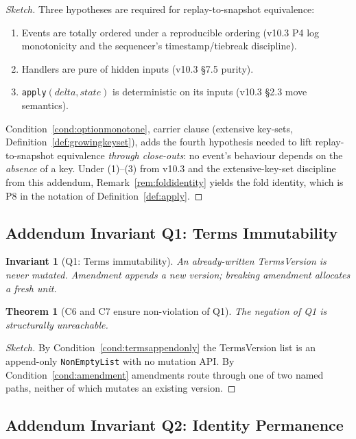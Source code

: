 \documentclass[11pt,a4paper]{article}
\newtheorem{theorem}[definition]{Theorem}
\newtheorem{invariant}[definition]{Invariant}
\begin{document}
\begin{proof}[Sketch]
Three hypotheses are required for replay-to-snapshot equivalence:
\begin{enumerate}[leftmargin=*,nosep]
\item Events are totally ordered under a reproducible ordering (v10.3 P4 log monotonicity and the sequencer's timestamp/tiebreak discipline).
\item Handlers are pure of hidden inputs (v10.3 \S 7.5 purity).
\item \texttt{apply}$(\mathit{delta}, \mathit{state})$ is deterministic on its inputs (v10.3 \S 2.3 move semantics).
\end{enumerate}
Condition~\ref{cond:optionmonotone}, carrier clause (extensive key-sets, Definition~\ref{def:growingkeyset}), adds the fourth hypothesis needed to lift replay-to-snapshot equivalence \emph{through close-outs}: no event's behaviour depends on the \emph{absence} of a key. Under (1)--(3) from v10.3 and the extensive-key-set discipline from this addendum, Remark~\ref{rem:foldidentity} yields the fold identity, which is P8 in the notation of Definition~\ref{def:apply}.
\end{proof}

\subsection{Addendum Invariant Q1: Terms Immutability}

\begin{invariant}[Q1: Terms immutability]\label{inv:q1}
An already-written TermsVersion is never mutated. Amendment appends a new version; breaking amendment allocates a fresh unit.
\end{invariant}

\begin{theorem}[C6 and C7 ensure non-violation of Q1]
The negation of Q1 is structurally unreachable.
\end{theorem}

\begin{proof}[Sketch]
By Condition~\ref{cond:termsappendonly} the TermsVersion list is an append-only \texttt{NonEmptyList} with no mutation API. By Condition~\ref{cond:amendment} amendments route through one of two named paths, neither of which mutates an existing version.
\end{proof}

\subsection{Addendum Invariant Q2: Identity Permanence}
\end{document}
